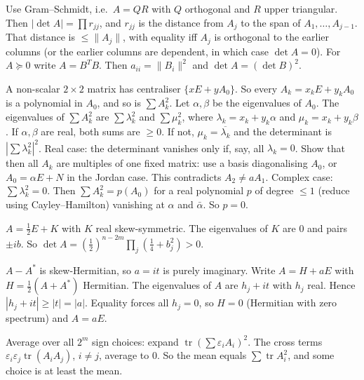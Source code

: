 \documentclass[11pt,a4paper]{article}
\begin{document}

Use Gram--Schmidt, i.e.\ \(A=QR\) with \(Q\) orthogonal and \(R\) upper triangular. Then \(|\det A|=\prod r_{jj}\), and \(r_{jj}\) is the distance from \(A_j\) to the span of \(A_1,\dots,A_{j-1}\).
That distance is \(\le\|A_j\|\), with equality iff \(A_j\) is orthogonal to the earlier columns (or the earlier columns are dependent, in which case \(\det A=0\)). For \(A\succeq0\) write \(A=B^TB\). Then \(a_{ii}=\|B_i\|^2\) and \(\det A=(\det B)^2\).

A non-scalar \(2\times2\) matrix has centraliser \(\{xE+yA_0\}\). So every \(A_k=x_kE+y_kA_0\) is a polynomial in \(A_0\), and so is \(\sum A_k^2\).
Let \(\alpha,\beta\) be the eigenvalues of \(A_0\). The eigenvalues of \(\sum A_k^2\) are \(\sum\lambda_k^2\) and \(\sum\mu_k^2\), where \(\lambda_k=x_k+y_k\alpha\) and \(\mu_k=x_k+y_k\beta\). If \(\alpha,\beta\) are real, both sums are \(\ge0\). If not, \(\mu_k=\overline{\lambda_k}\) and the determinant is \(|\sum\lambda_k^2|^2\).
Real case: the determinant vanishes only if, say, all \(\lambda_k=0\). Show that then all \(A_k\) are multiples of one fixed matrix: use a basis diagonalising \(A_0\), or \(A_0=\alpha E+N\) in the Jordan case. This contradicts \(A_2\ne aA_1\).
Complex case: \(\sum\lambda_k^2=0\). Then \(\sum A_k^2=p(A_0)\) for a real polynomial \(p\) of degree \(\le1\) (reduce using Cayley--Hamilton) vanishing at \(\alpha\) and \(\bar\alpha\). So \(p=0\).

\(A=\frac12E+K\) with \(K\) real skew-symmetric. The eigenvalues of \(K\) are \(0\) and pairs \(\pm ib\).
So \(\det A=(\frac12)^{n-2m}\prod_j(\frac14+b_j^2)>0\).

\(A-A^*\) is skew-Hermitian, so \(a=it\) is purely imaginary. Write \(A=H+aE\) with \(H=\frac12(A+A^*)\) Hermitian.
The eigenvalues of \(A\) are \(h_j+it\) with \(h_j\) real. Hence \(|h_j+it|\ge|t|=|a|\).
Equality forces all \(h_j=0\), so \(H=0\) (Hermitian with zero spectrum) and \(A=aE\).

Average over all \(2^m\) sign choices: expand \(\operatorname{tr}(\sum\varepsilon_iA_i)^2\).
The cross terms \(\varepsilon_i\varepsilon_j\operatorname{tr}(A_iA_j)\), \(i\ne j\), average to \(0\). So the mean equals \(\sum\operatorname{tr}A_i^2\), and some choice is at least the mean.
\end{document}
